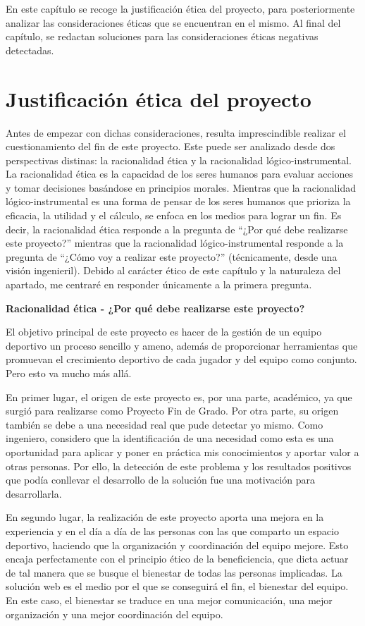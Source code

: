 En este capítulo se recoge la justificación ética del proyecto, para posteriormente analizar las consideraciones éticas que se encuentran en el mismo. Al final del capítulo, se redactan soluciones para las consideraciones éticas negativas detectadas.

\section{Justificación ética del proyecto}

Antes de empezar con dichas consideraciones, resulta imprescindible realizar el cuestionamiento del fin de este proyecto. Este puede ser analizado desde dos perspectivas distinas: la racionalidad ética y la racionalidad lógico-instrumental. La racionalidad ética es la capacidad de los seres humanos para evaluar acciones y tomar decisiones basándose en principios morales. Mientras que la racionalidad lógico-instrumental es una forma de pensar de los seres humanos que prioriza la eficacia, la utilidad y el cálculo, se enfoca en los medios para lograr un fin. Es decir, la racionalidad ética responde a la pregunta de ``¿Por qué debe realizarse este proyecto?'' mientras que la racionalidad lógico-instrumental responde a la pregunta de ``¿Cómo voy a realizar este proyecto?'' (técnicamente, desde una visión ingenieril). Debido al carácter ético de este capítulo y la naturaleza del apartado, me centraré en responder únicamente a la primera pregunta.

\textbf{Racionalidad ética - ¿Por qué debe realizarse este proyecto?}

El objetivo principal de este proyecto es hacer de la gestión de un equipo deportivo un proceso sencillo y ameno, además de proporcionar herramientas que promuevan el crecimiento deportivo de cada jugador y del equipo como conjunto. Pero esto va mucho más allá.

En primer lugar, el origen de este proyecto es, por una parte, académico, ya que surgió para realizarse como Proyecto Fin de Grado. Por otra parte, su origen también se debe a una necesidad real que pude detectar yo mismo. Como ingeniero, considero que la identificación de una necesidad como esta es una oportunidad para aplicar y poner en práctica mis conocimientos y aportar valor a otras personas. Por ello, la detección de este problema y los resultados positivos que podía conllevar el desarrollo de la solución fue una motivación para desarrollarla.

En segundo lugar, la realización de este proyecto aporta una mejora en la experiencia y en el día a día de las personas con las que comparto un espacio deportivo, haciendo que la organización y coordinación del equipo mejore. Esto encaja perfectamente con el principio ético de la beneficiencia, que dicta actuar de tal manera que se busque el bienestar de todas las personas implicadas. La solución web es el medio por el que se conseguirá el fin, el bienestar del equipo. En este caso, el bienestar se traduce en una mejor comunicación, una mejor organización y una mejor coordinación del equipo.

